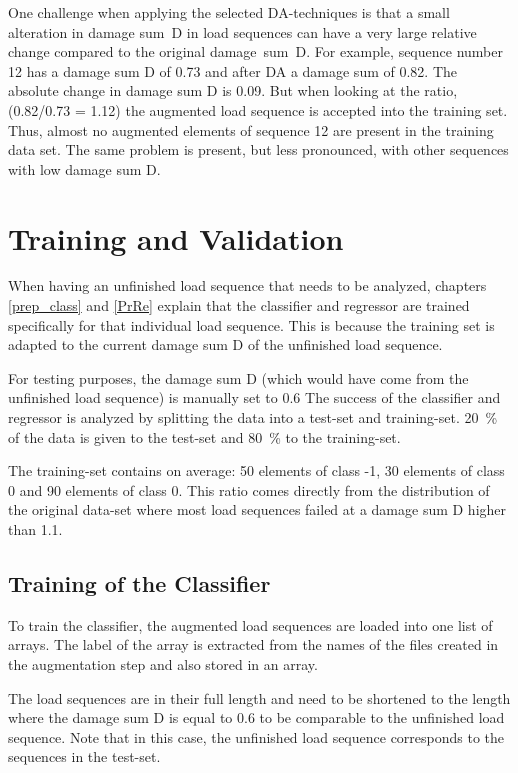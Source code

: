 One challenge when applying the selected DA-techniques is that a small alteration in damage sum~D in load sequences can have a very large relative change compared to the original damage~sum~D. For example, sequence number 12 has a damage sum D of 0.73 and after DA a damage sum of 0.82. The absolute change in damage sum D is 0.09. But when looking at the ratio, (0.82/0.73 = 1.12) the augmented load sequence is accepted into the training set. Thus, almost no augmented elements of sequence 12 are present in the training data set. The same problem is present, but less pronounced, with other sequences with low damage sum D.



\section{Training and Validation}
When having an unfinished load sequence that needs to be analyzed, chapters \ref{prep_class} and \ref{PrRe} explain that the classifier and regressor are trained specifically for that individual load sequence. This is because the training set is adapted to the current damage sum D of the unfinished load sequence.

For testing purposes, the damage sum D (which would have come from the unfinished load sequence) is manually set to 0.6
The success of the classifier and regressor is analyzed by splitting the data into a test-set and training-set. 
20~\% of the data is given to the test-set and 80~\% to the training-set.

The training-set contains on average: 50 elements of class -1, 30 elements of class 0 and 90 elements of class 0. This ratio comes directly from the distribution of the original data-set where most load sequences failed at a damage sum D higher than 1.1.

\subsection{Training of the Classifier}
To train the classifier, the augmented load sequences are loaded into one list of arrays. The label of the array is extracted from the names of the files created in the augmentation step and also stored in an array. 

The load sequences are in their full length and need to be shortened to the length where the damage sum D is equal to 0.6 to be comparable to the unfinished load sequence. Note that in this case, the unfinished load sequence corresponds to the sequences in the test-set. 


